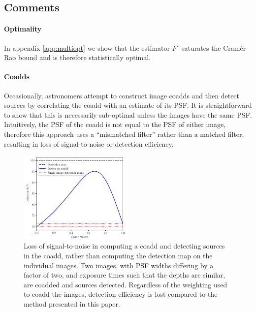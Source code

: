 \documentclass[letterpaper,preprint]{aastex62}
\begin{document}
\subsection{Comments}

\paragraph{Optimality}
In appendix \ref{app:multiopt} we show that the estimator $F^{\star}$
saturates the Cram\'er--Rao bound and is therefore statistically
optimal.

\paragraph{Coadds}
Occasionally, astronomers attempt to construct image coadds and then
detect sources by correlating the coadd with an estimate of its PSF.
It is straightforward to show that this is necessarily sub-optimal
unless the images have the same PSF.  Intuitively, the PSF of the
coadd is not equal to the PSF of either image, therefore this approach
uses a ``mismatched filter'' rather than a matched filter, resulting
in loss of signal-to-noise or detection efficiency.

\begin{figure}[h]
  \begin{center}
  \includegraphics[width=0.5\textwidth]{dont-coadd}
  \caption{Loss of signal-to-noise in computing a coadd and detecting
    sources in the coadd, rather than computing the detection map on
    the individual images.  Two images, with PSF widths differing by a
    factor of two, and exposure times such that the depths are
    similar, are coadded and sources detected.  Regardless of the
    weighting used to coadd the images, detection efficiency is lost
    compared to the method presented in this paper.\label{fig:dontcoadd}}
  \end{center}
\end{figure}
\end{document}
